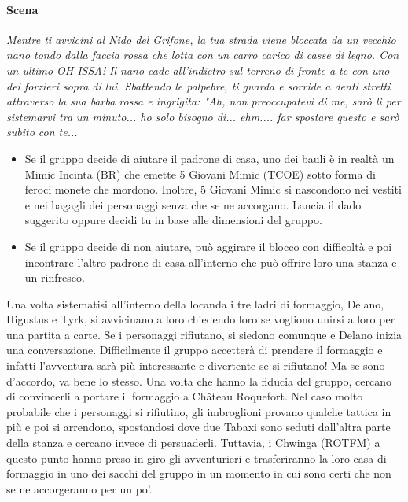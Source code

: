 \documentclass{article}
\begin{document}
\paragraph{Scena}\textit{Mentre ti avvicini al Nido del Grifone, la tua strada viene bloccata da un vecchio nano tondo dalla faccia rossa che lotta con un carro carico di casse di legno. Con un ultimo OH ISSA! Il nano cade all'indietro sul terreno di fronte a te con uno dei forzieri sopra di lui. Sbattendo le palpebre, ti guarda e sorride a denti stretti attraverso la sua barba rossa e ingrigita: "Ah, non preoccupatevi di me, sarò lì per sistemarvi tra un minuto... ho solo bisogno di... ehm.... far spostare questo e sarò subito con te...}
\begin{itemize}

\item Se il gruppo decide di aiutare il padrone di casa, uno dei bauli è in realtà un Mimic Incinta (BR) che emette 5 Giovani Mimic (TCOE) sotto forma di feroci monete che mordono. Inoltre, 5 Giovani Mimic si nascondono nei vestiti e nei bagagli dei personaggi senza che se ne accorgano. Lancia il dado suggerito oppure decidi tu in base alle dimensioni del gruppo.
\item Se il gruppo decide di non aiutare, può aggirare il blocco con difficoltà e poi incontrare l'altro padrone di casa all'interno che può offrire loro una stanza e un rinfresco.
\end{itemize}
Una volta sistematisi all'interno della locanda i tre ladri di formaggio, Delano, Higustus e Tyrk, si avvicinano a loro chiedendo loro se vogliono unirsi a loro per una partita a carte. Se i personaggi rifiutano, si siedono comunque e Delano inizia una conversazione.
Difficilmente il gruppo accetterà di prendere il formaggio e infatti l'avventura sarà più interessante e divertente se si rifiutano! Ma se sono d'accordo, va bene lo stesso.
Una volta che hanno la fiducia del gruppo, cercano di convincerli a portare il formaggio a Château Roquefort. Nel caso molto probabile che i personaggi si rifiutino, gli imbroglioni provano qualche tattica in più e poi si arrendono, spostandosi dove due Tabaxi sono seduti dall'altra parte della stanza e cercano invece di persuaderli.
Tuttavia, i Chwinga (ROTFM) a questo punto hanno preso in giro gli avventurieri e trasferiranno la loro casa di formaggio in uno dei sacchi del gruppo in un momento in cui sono certi che non se ne accorgeranno per un po'.
\end{document}
